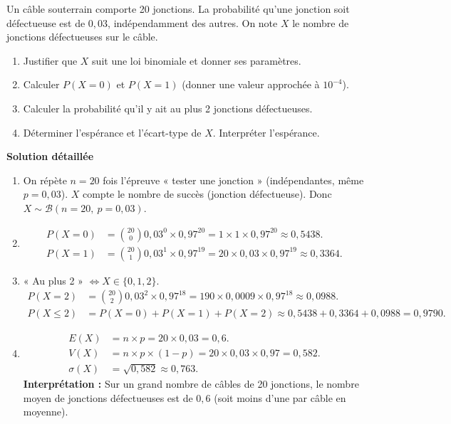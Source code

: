 \documentclass[11pt]{article}
\begin{document}
\begin{exoresolu}
Un câble souterrain comporte 20 jonctions. La probabilité qu'une jonction soit défectueuse est de $0,03$, indépendamment des autres. On note $X$ le nombre de jonctions défectueuses sur le câble.
\begin{enumerate}
    \item Justifier que $X$ suit une loi binomiale et donner ses paramètres.
    \item Calculer $P(X=0)$ et $P(X=1)$ (donner une valeur approchée à $10^{-4}$).
    \item Calculer la probabilité qu'il y ait au plus 2 jonctions défectueuses.
    \item Déterminer l'espérance et l'écart-type de $X$. Interpréter l'espérance.
\end{enumerate}
\tcblower
\textbf{Solution détaillée}
\begin{enumerate}
    \item On répète $n=20$ fois l'épreuve « tester une jonction » (indépendantes, même $p=0,03$). $X$ compte le nombre de succès (jonction défectueuse). Donc $X \sim \mathcal{B}(n=20,\ p=0,03)$.
    \item 
    \begin{align*}
        P(X=0) &= \binom{20}{0} 0,03^0 \times 0,97^{20} = 1 \times 1 \times 0,97^{20} \approx 0,5438. \\
        P(X=1) &= \binom{20}{1} 0,03^1 \times 0,97^{19} = 20 \times 0,03 \times 0,97^{19} \approx 0,3364.
    \end{align*}
    \item « Au plus 2 » $\iff X \in \{0, 1, 2\}$.
    \begin{align*}
        P(X=2) &= \binom{20}{2} 0,03^2 \times 0,97^{18} = 190 \times 0,0009 \times 0,97^{18} \approx 0,0988. \\
        P(X \le 2) &= P(X=0)+P(X=1)+P(X=2) \approx 0,5438 + 0,3364 + 0,0988 = 0,9790.
    \end{align*}
    \item 
    \begin{align*}
        E(X) &= n \times p = 20 \times 0,03 = 0,6. \\
        V(X) &= n \times p \times (1-p) = 20 \times 0,03 \times 0,97 = 0,582. \\
        \sigma(X) &= \sqrt{0,582} \approx 0,763.
    \end{align*}
    \textbf{Interprétation :} Sur un grand nombre de câbles de 20 jonctions, le nombre moyen de jonctions défectueuses est de $0,6$ (soit moins d'une par câble en moyenne).
\end{enumerate}
\end{exoresolu}
\end{document}
